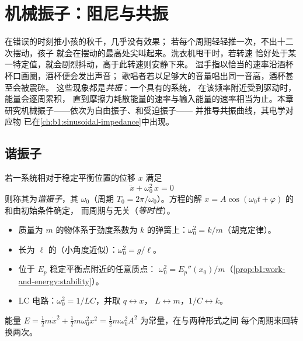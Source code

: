  \chapter{机械振子：阻尼与共振}\label{ch:b1:oscillators-resonance}

在错误的时刻推小孩的秋千，几乎没有效果；
若每个周期轻轻推一次，不出十二次摆动，孩子
就会在摆动的最高处尖叫起来。洗衣机甩干时，若转速
恰好处于某一特定值，就会剧烈抖动，高于此转速则安静下来。
湿手指以恰当的速率沿酒杯杯口画圈，酒杯便会发出声音；
歌唱者若以足够大的音量唱出同一音高，酒杯甚至会被震碎。
这些现象都是\emph{共振}：一个具有的系统，
在该频率附近受到驱动时，能量会逐周累积，
直到摩擦力耗散能量的速率与输入能量的速率相当为止。本章
研究机械振子——依次为自由振子、和受迫振子——
并推导共振曲线，其电学对应物
已在\cref{ch:b1:sinusoidal-impedance}中出现。

\section{谐振子}

\begin{definition}[谐振子]\label{def:b1:oscillators-resonance:harmonic}
若一系统相对于稳定平衡位置的位移 $x$ 满足
\[
\ddot x + \omega_0^2\,x = 0
\]
则称其为\emph{谐振子}，其\emph{}
$\omega_0$（周期 $T_0 = 2\pi/\omega_0$）。方程的解 $x = A\cos(\omega_0t
+ \varphi)$ 的和由初始条件确定，
而周期与无关（\emph{等时性}）。
\end{definition}

\begin{proposition}[谐振子的来源]\label{prop:b1:oscillators-resonance:sources}
\begin{itemize}
  \item 质量为 $m$ 的物体系于劲度系数为 $k$ 的弹簧上：$\omega_0^2 = k/m$（胡克定律）。
  \item 长为 $\ell$ 的（小角度近似）：$\omega_0^2 = g/\ell$。
  \item 位于 $E_p$ 稳定平衡点附近的任意质点：
        $\omega_0^2 = E_p''(x_0)/m$（\cref{prop:b1:work-and-energy:stability}）。
  \item LC 电路：$\omega_0^2 = 1/LC$，并取 $q \leftrightarrow x$，
        $L \leftrightarrow m$，$1/C \leftrightarrow k$。
\end{itemize}
能量 $E = \tfrac12 m\dot x^2 + \tfrac12 m\omega_0^2x^2 = \tfrac12
m\omega_0^2A^2$ 为常量，在与两种形式之间
每个周期来回转换两次。
\end{proposition}

